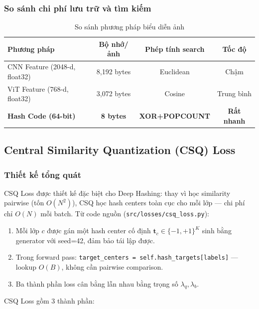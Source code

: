 \documentclass[13pt,a4paper]{article}
\begin{document}
\subsubsection{So sánh chi phí lưu trữ và tìm kiếm}

\begin{table}[H]
\centering
\caption{So sánh phương pháp biểu diễn ảnh}
\label{tab:storage_comparison}
\begin{tabular}{lccc}
\toprule
\textbf{Phương pháp} & \textbf{Bộ nhớ/ảnh} & \textbf{Phép tính search} & \textbf{Tốc độ} \\
\midrule
CNN Feature (2048-d, float32)   & 8{,}192 bytes  & Euclidean       & Chậm \\
ViT Feature (768-d, float32)    & 3{,}072 bytes  & Cosine          & Trung bình \\
\textbf{Hash Code (64-bit)}     & \textbf{8 bytes} & \textbf{XOR+POPCOUNT} & \textbf{Rất nhanh} \\
\bottomrule
\end{tabular}
\end{table}


\subsection{Central Similarity Quantization (CSQ) Loss}

\subsubsection{Thiết kế tổng quát}

CSQ Loss được thiết kế đặc biệt cho Deep Hashing: thay vì học similarity pairwise (tốn $O(N^2)$), CSQ học hash centers toàn cục cho mỗi lớp --- chi phí chỉ $O(N)$ mỗi batch. Từ code nguồn (\texttt{src/losses/csq\_loss.py}):

\begin{enumerate}
    \item Mỗi lớp $c$ được gán một hash center cố định $\mathbf{t}_c \in \{-1,+1\}^K$ sinh bằng generator với seed=42, đảm bảo tái lập được.
    \item Trong forward pass: \texttt{target\_centers = self.hash\_targets[labels]} --- lookup $O(B)$, không cần pairwise comparison.
    \item Ba thành phần loss cân bằng lẫn nhau bằng trọng số $\lambda_q, \lambda_b$.
\end{enumerate}

CSQ Loss gồm 3 thành phần:
\end{document}
